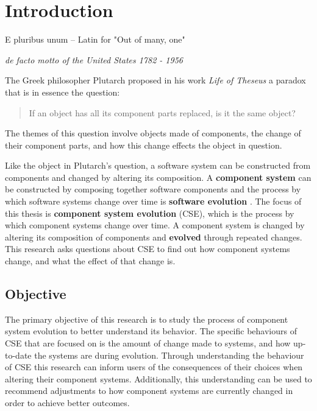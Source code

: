 \chapter{Introduction}
\label{introduction}
\epigraph{E pluribus unum -- Latin for "Out of many, one"}
{\textit{de facto motto of the United States 1782 - 1956}}
The Greek philosopher Plutarch proposed in his work \textit{Life of Theseus} a paradox that is in essence the question:
\begin{quote}
If an object has all its component parts replaced, is it the same object?
\end{quote}
The themes of this question involve objects made of components, the change of their component parts,
and how this change effects the object in question.

Like the object in Plutarch's question, a software system can be constructed from components and changed by altering its composition.
A \textbf{component system} can be constructed by composing together software components \citep{Szyperski2002}
and the process by which software systems change over time is \textbf{software evolution} \citep{lehman1980}.
The focus of this thesis is \textbf{component system evolution} (CSE), which is the process by which component systems change over time.
A component system is changed by altering its composition of components and \textbf{evolved} through repeated changes.
This research asks questions about CSE to find out how component systems change, and what the effect of that change is.

\section{Objective}
The primary objective of this research is to study the process of component system evolution to better understand its behavior.
The specific behaviours of CSE that are focused on is the amount of change made to systems, and how up-to-date the systems are during evolution.
Through understanding the behaviour of CSE this research can inform users of the consequences of their choices when altering their component systems.
Additionally, this understanding can be used to recommend adjustments to how component systems are currently changed in order to achieve better outcomes. 

